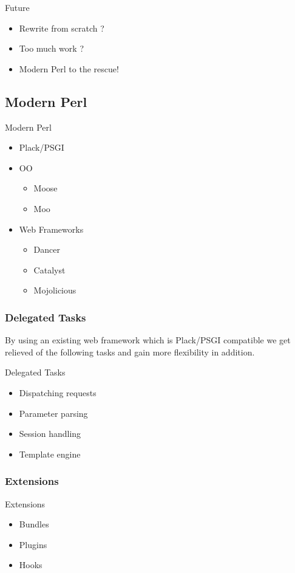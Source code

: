 \begin{frame}{Future}
\begin{itemize}
\item Rewrite from scratch ?
\item<2-3> Too much work ?
\item<3> Modern Perl to the rescue!
\end{itemize}
\end{frame}

\subsection{Modern Perl}

\begin{frame}{Modern Perl}
\begin{itemize}
\item Plack/PSGI
\item OO
  \begin{itemize}
  \item Moose
  \item Moo
  \end{itemize}
\item Web Frameworks
 \begin{itemize}
  \item Dancer
  \item Catalyst
  \item Mojolicious
  \end{itemize}
\end{itemize}
\end{frame}

\subsubsection{Delegated Tasks}
By using an existing web framework which is Plack/PSGI compatible
we get relieved of the following
tasks and gain more flexibility in
addition.
 
\begin{frame}{Delegated Tasks}
\begin{itemize}
\item Dispatching requests
\item Parameter parsing
\item Session handling
\item Template engine
\end{itemize}
\end{frame}

\subsubsection{Extensions}
\begin{frame}{Extensions}
\begin{itemize}
\item Bundles
\item Plugins
\item Hooks
\end{itemize}
\end{frame}

